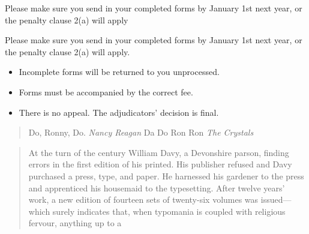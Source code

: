 \parbox{1in}{Please make sure you send in your completed
forms by January 1st next year, or the penalty
clause 2(a) will apply}


\begin{minipage}{3in}
Please make sure you send in your completed forms by January
1st next year, or the penalty clause 2(a) will apply.
\begin{itemize}
\item Incomplete forms will be returned to you unprocessed.
\item Forms must be accompanied by the correct fee.
\item There is no appeal. The adjudicators’ decision is final.
\end{itemize}
\end{minipage}

\setlength{\fboxsep}{1em}
\setlength{\fboxrule}{2pt}

\vspace{20cm}

\begin{quote}
Do, Ronny, Do. \textit{Nancy Reagan}
Da Do Ron Ron \textit{The Crystals}
\end{quote}


\begin{quotation}\small
At the turn of the century William Davy, a Devonshire
parson, finding errors in the first edition of his
printed. His publisher refused and Davy purchased a
press, type, and paper. He harnessed his gardener to
the press and apprenticed his housemaid to the
typesetting. After twelve years’ work, a new
edition of fourteen sets of twenty-six volumes was
issued---which surely indicates that, when typomania
is coupled with religious fervour, anything up to a
\end{quotation}


